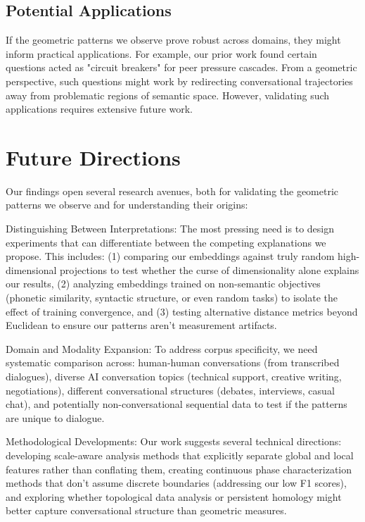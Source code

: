\documentclass[11pt,letterpaper]{article}
\begin{document}
\subsection{Potential Applications}

If the geometric patterns we observe prove robust across domains, they might inform practical applications. For example, our prior work found certain questions acted as "circuit breakers" for peer pressure cascades. From a geometric perspective, such questions might work by redirecting conversational trajectories away from problematic regions of semantic space. However, validating such applications requires extensive future work.

\section{Future Directions}

Our findings open several research avenues, both for validating the geometric patterns we observe and for understanding their origins:

Distinguishing Between Interpretations: The most pressing need is to design experiments that can differentiate between the competing explanations we propose. This includes: (1) comparing our embeddings against truly random high-dimensional projections to test whether the curse of dimensionality alone explains our results, (2) analyzing embeddings trained on non-semantic objectives (phonetic similarity, syntactic structure, or even random tasks) to isolate the effect of training convergence, and (3) testing alternative distance metrics beyond Euclidean to ensure our patterns aren't measurement artifacts.

Domain and Modality Expansion: To address corpus specificity, we need systematic comparison across: human-human conversations (from transcribed dialogues), diverse AI conversation topics (technical support, creative writing, negotiations), different conversational structures (debates, interviews, casual chat), and potentially non-conversational sequential data to test if the patterns are unique to dialogue.

Methodological Developments: Our work suggests several technical directions: developing scale-aware analysis methods that explicitly separate global and local features rather than conflating them, creating continuous phase characterization methods that don't assume discrete boundaries (addressing our low F1 scores), and exploring whether topological data analysis or persistent homology might better capture conversational structure than geometric measures.
\end{document}
